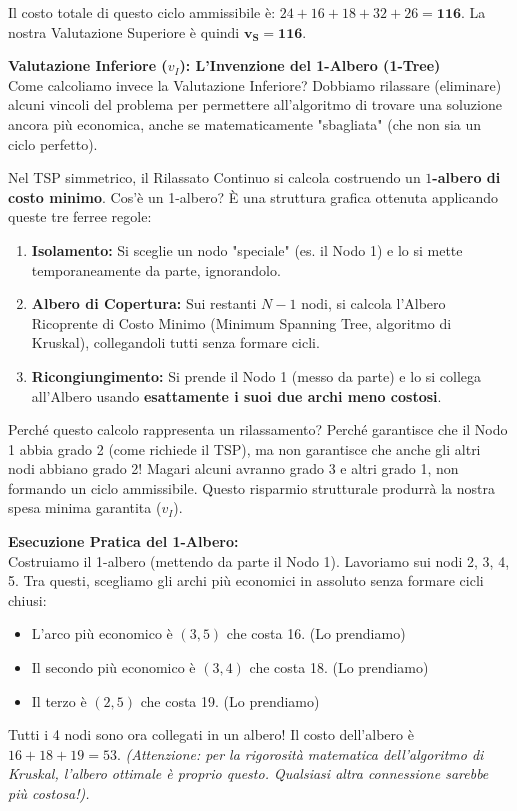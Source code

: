\documentclass[12pt, a4paper]{article}
\newcommand{\separatore}{\noindent{\color{titlecolor!50}\rule{\textwidth}{0.6pt}}}
\begin{document}
	Il costo totale di questo ciclo ammissibile è: $24 + 16 + 18 + 32 + 26 = \mathbf{116}$.
	La nostra Valutazione Superiore è quindi $\mathbf{v_S = 116}$.
	
	\vspace{0.6cm}
	\separatore
	\vspace{0.4cm}
	
	\textbf{Valutazione Inferiore ($v_I$): L'Invenzione del 1-Albero (1-Tree)}\\
	Come calcoliamo invece la Valutazione Inferiore? Dobbiamo rilassare (eliminare) alcuni vincoli del problema per permettere all'algoritmo di trovare una soluzione ancora più economica, anche se matematicamente "sbagliata" (che non sia un ciclo perfetto).
	
	Nel TSP simmetrico, il Rilassato Continuo si calcola costruendo un \textbf{$1$-albero di costo minimo}.
	Cos'è un 1-albero? È una struttura grafica ottenuta applicando queste tre ferree regole:
	\begin{enumerate}
		\item \textbf{Isolamento:} Si sceglie un nodo "speciale" (es. il Nodo 1) e lo si mette temporaneamente da parte, ignorandolo.
		\item \textbf{Albero di Copertura:} Sui restanti $N-1$ nodi, si calcola l'Albero Ricoprente di Costo Minimo (Minimum Spanning Tree, algoritmo di Kruskal), collegandoli tutti senza formare cicli.
		\item \textbf{Ricongiungimento:} Si prende il Nodo 1 (messo da parte) e lo si collega all'Albero usando \textbf{esattamente i suoi due archi meno costosi}.
	\end{enumerate}
	Perché questo calcolo rappresenta un rilassamento? Perché garantisce che il Nodo 1 abbia grado 2 (come richiede il TSP), ma non garantisce che anche gli altri nodi abbiano grado 2! Magari alcuni avranno grado 3 e altri grado 1, non formando un ciclo ammissibile. Questo risparmio strutturale produrrà la nostra spesa minima garantita ($v_I$).
	
	\textbf{Esecuzione Pratica del 1-Albero:}\\
	Costruiamo il 1-albero (mettendo da parte il Nodo 1). Lavoriamo sui nodi {2, 3, 4, 5}.
	Tra questi, scegliamo gli archi più economici in assoluto senza formare cicli chiusi:
	\begin{itemize}[label=$\circ$, itemsep=2pt, leftmargin=1.5cm]
		\item L'arco più economico è $(3,5)$ che costa 16. (Lo prendiamo)
		\item Il secondo più economico è $(3,4)$ che costa 18. (Lo prendiamo)
		\item Il terzo è $(2,5)$ che costa 19. (Lo prendiamo)
	\end{itemize}
	Tutti i 4 nodi sono ora collegati in un albero! Il costo dell'albero è $16 + 18 + 19 = 53$.
	\textit{(Attenzione: per la rigorosità matematica dell'algoritmo di Kruskal, l'albero ottimale è proprio questo. Qualsiasi altra connessione sarebbe più costosa!).}
	
\end{document}
